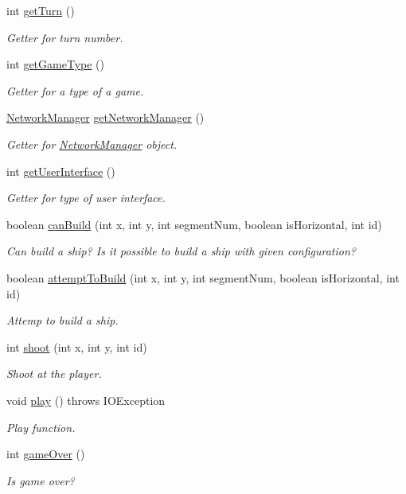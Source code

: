 \begin{DoxyCompactItemize}
int \hyperlink{classGame_ae518e278826e5feba6f9fc5f3818ad02}{get\+Turn} ()
\begin{DoxyCompactList}\small\item\em Getter for turn number. \end{DoxyCompactList}\item 
int \hyperlink{classGame_a21b344d249e50b6a12fbbb2ab15fd988}{get\+Game\+Type} ()
\begin{DoxyCompactList}\small\item\em Getter for a type of a game. \end{DoxyCompactList}\item 
\hyperlink{interfaceNetworkManager}{Network\+Manager} \hyperlink{classGame_a41a21632eaa1842822bf57161bea61e4}{get\+Network\+Manager} ()
\begin{DoxyCompactList}\small\item\em Getter for \hyperlink{interfaceNetworkManager}{Network\+Manager} object. \end{DoxyCompactList}\item 
int \hyperlink{classGame_a58893520607641213710ecf42d4984c0}{get\+User\+Interface} ()
\begin{DoxyCompactList}\small\item\em Getter for type of user interface. \end{DoxyCompactList}\item 
boolean \hyperlink{classGame_af151f3c1db692f8dc482b5ad2351c723}{can\+Build} (int x, int y, int segment\+Num, boolean is\+Horizontal, int id)
\begin{DoxyCompactList}\small\item\em Can build a ship? Is it possible to build a ship with given configuration? \end{DoxyCompactList}\item 
boolean \hyperlink{classGame_af2b475289d83fd193e7e648e0f98a69d}{attempt\+To\+Build} (int x, int y, int segment\+Num, boolean is\+Horizontal, int id)
\begin{DoxyCompactList}\small\item\em Attemp to build a ship. \end{DoxyCompactList}\item 
int \hyperlink{classGame_acdb27fef4ad28c9a9c07e7f095611f36}{shoot} (int x, int y, int id)
\begin{DoxyCompactList}\small\item\em Shoot at the player. \end{DoxyCompactList}\item 
void \hyperlink{classGame_afeae4232ad3b23d07dcccc383e14ff08}{play} ()  throws I\+O\+Exception 
\begin{DoxyCompactList}\small\item\em Play function. \end{DoxyCompactList}\item 
int \hyperlink{classGame_a81bd2e305d61946b102ed5094d2fa6c0}{game\+Over} ()
\begin{DoxyCompactList}\small\item\em Is game over? \end{DoxyCompactList}\end{DoxyCompactItemize}
